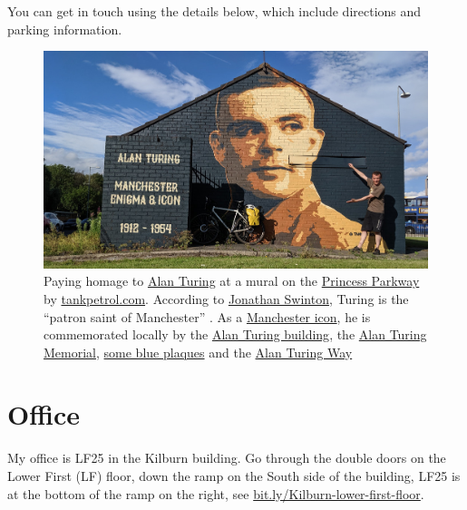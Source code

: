 \documentclass[
  12pt,
]{book}
\begin{document}
You can get in touch using the details below, which include directions and parking information.



\begin{figure}

{\centering \includegraphics[width=1\linewidth]{images/turingicon} 

}

\caption{Paying homage to \href{https://en.wikipedia.org/wiki/Alan_Turing}{Alan Turing} at a mural on the \href{https://en.wikipedia.org/wiki/A5103_road}{Princess Parkway} by \href{http://tankpetrol.com/}{tankpetrol.com}. According to \href{https://www.manturing.net/jonathan}{Jonathan Swinton}, Turing is the ``patron saint of Manchester'' \citep{manturing}. As a \href{https://en.wikipedia.org/wiki/Symbols_of_Manchester}{Manchester icon}, he is commemorated locally by the \href{https://en.wikipedia.org/wiki/Alan_Turing_Building}{Alan Turing building}, the \href{https://en.wikipedia.org/wiki/Alan_Turing_Memorial}{Alan Turing Memorial}, \href{https://duncan.hull.name/2021/07/07/turings-house/}{some blue plaques} and the \href{https://www.google.com/maps/place/Alan+Turing+Way,+Manchester/}{Alan Turing Way} \citep{turingway}}\label{fig:unnamed-chunk-8}
\end{figure}

\hypertarget{office}{%
\section{Office}\label{office}}

My office is LF25 in the Kilburn building. Go through the double doors on the Lower First (LF) floor, down the ramp on the South side of the building, LF25 is at the bottom of the ramp on the right, see \href{https://bit.ly/Kilburn-lower-first-floor}{bit.ly/Kilburn-lower-first-floor}.
\end{document}
